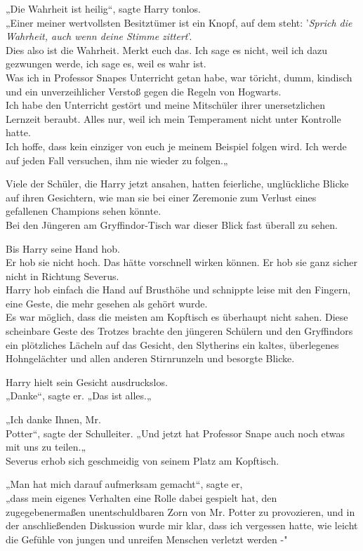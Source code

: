 {„Die Wahrheit ist heilig“, sagte Harry tonlos.\\ „Einer meiner wertvollsten Besitztümer ist ein Knopf, auf dem steht: '\emph{Sprich die Wahrheit, auch wenn deine Stimme zittert}'.\\ Dies also ist die Wahrheit. Merkt euch das. Ich sage es nicht, weil ich dazu gezwungen werde, ich sage es, weil es wahr ist.\\ Was ich in Professor Snapes Unterricht getan habe, war töricht, dumm, kindisch und ein unverzeihlicher Verstoß gegen die Regeln von Hogwarts.\\ Ich habe den Unterricht gestört und meine Mitschüler ihrer unersetzlichen Lernzeit beraubt. Alles nur, weil ich mein Temperament nicht unter Kontrolle hatte.\\ Ich hoffe, dass kein einziger von euch je meinem Beispiel folgen wird. Ich werde auf jeden Fall versuchen, ihm nie wieder zu folgen.„

Viele der Schüler, die Harry jetzt ansahen, hatten feierliche, unglückliche Blicke auf ihren Gesichtern, wie man sie bei einer Zeremonie zum Verlust eines gefallenen Champions sehen könnte.\\ Bei den Jüngeren am Gryffindor-Tisch war dieser Blick fast überall zu sehen.

Bis Harry seine Hand hob.\\ Er hob sie nicht hoch. Das hätte vorschnell wirken können. Er hob sie ganz sicher nicht in Richtung Severus.\\ Harry hob einfach die Hand auf Brusthöhe und schnippte leise mit den Fingern, eine Geste, die mehr gesehen als gehört wurde.\\ Es war möglich, dass die meisten am Kopftisch es überhaupt nicht sahen. Diese scheinbare Geste des Trotzes brachte den jüngeren Schülern und den Gryffindors ein plötzliches Lächeln auf das Gesicht, den Slytherins ein kaltes, überlegenes Hohngelächter und allen anderen Stirnrunzeln und besorgte Blicke.

Harry hielt sein Gesicht ausdruckslos.\\ „Danke“, sagte er. „Das ist alles.„

„Ich danke Ihnen, Mr.\\ Potter“, sagte der Schulleiter. „Und jetzt hat Professor Snape auch noch etwas mit uns zu teilen.„\\ Severus erhob sich geschmeidig von seinem Platz am Kopftisch.

„Man hat mich darauf aufmerksam gemacht“, sagte er,\\ „dass mein eigenes Verhalten eine Rolle dabei gespielt hat, den zugegebenermaßen unentschuldbaren Zorn von Mr. Potter zu provozieren, und in der anschließenden Diskussion wurde mir klar, dass ich vergessen hatte, wie leicht die Gefühle von jungen und unreifen Menschen verletzt werden -"

}
